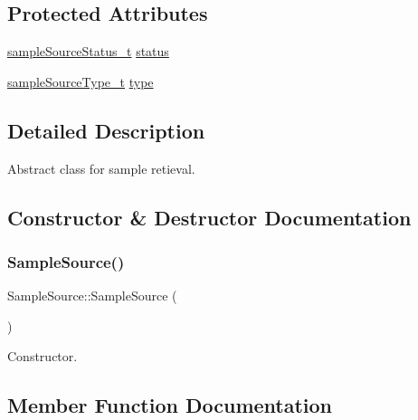 \subsection*{Protected Attributes}
\begin{DoxyCompactItemize}
\item 
\hyperlink{namespacedrumpi_1_1audio_a51bdf5757f414341f104d45e75e2bf63}{sample\+Source\+Status\+\_\+t} \hyperlink{classdrumpi_1_1audio_1_1SampleSource_a0278ea1fe44e5c1c643d6c8549302f19}{status}
\item 
\hyperlink{namespacedrumpi_1_1audio_a997f55e8a5b5348cf74dbedb7abe8a59}{sample\+Source\+Type\+\_\+t} \hyperlink{classdrumpi_1_1audio_1_1SampleSource_af3411ed42fcc880fb0a69d2dd80aac18}{type}
\end{DoxyCompactItemize}


\subsection{Detailed Description}
Abstract class for sample retieval. 

\subsection{Constructor \& Destructor Documentation}
\mbox{\label{classdrumpi_1_1audio_1_1SampleSource_a8c83ab0aa33861c5f88783b3a818ffba}} 
\subsubsection{\texorpdfstring{Sample\+Source()}{SampleSource()}}
{\footnotesize\ttfamily Sample\+Source\+::\+Sample\+Source (\begin{DoxyParamCaption}{ }\end{DoxyParamCaption})}

Constructor. 

\subsection{Member Function Documentation}
\mbox{\label{classdrumpi_1_1audio_1_1SampleSource_ab3f12884325b818ebe088dec5daa15cd}} 

